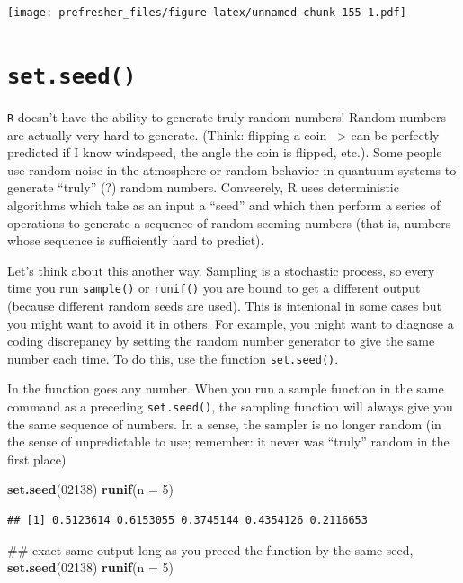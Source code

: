 \documentclass[]{book}
\newenvironment{Shaded}{\begin{snugshade}}{\end{snugshade}}
\newcommand{\KeywordTok}[1]{\textcolor[rgb]{0.13,0.29,0.53}{\textbf{#1}}}
\newcommand{\DataTypeTok}[1]{\textcolor[rgb]{0.13,0.29,0.53}{#1}}
\newcommand{\DecValTok}[1]{\textcolor[rgb]{0.00,0.00,0.81}{#1}}
\newcommand{\NormalTok}[1]{#1}
\theoremstyle{definition}
\theoremstyle{definition}
\theoremstyle{definition}
\theoremstyle{remark}
\begin{document}
\texttt{[image: prefresher\_files/figure-latex/unnamed-chunk-155-1.pdf]}

\section{\texorpdfstring{\texttt{set.seed()}}{set.seed()}}\label{set.seed}

\texttt{R} doesn't have the ability to generate truly random numbers!
Random numbers are actually very hard to generate. (Think: flipping a
coin --\textgreater{} can be perfectly predicted if I know windspeed,
the angle the coin is flipped, etc.). Some people use random noise in
the atmosphere or random behavior in quantuum systems to generate
``truly'' (?) random numbers. Convserely, R uses deterministic
algorithms which take as an input a ``seed'' and which then perform a
series of operations to generate a sequence of random-seeming numbers
(that is, numbers whose sequence is sufficiently hard to predict).

Let's think about this another way. Sampling is a stochastic process, so
every time you run \texttt{sample()} or \texttt{runif()} you are bound
to get a different output (because different random seeds are used).
This is intenional in some cases but you might want to avoid it in
others. For example, you might want to diagnose a coding discrepancy by
setting the random number generator to give the same number each time.
To do this, use the function \texttt{set.seed()}.

In the function goes any number. When you run a sample function in the
same command as a preceding \texttt{set.seed()}, the sampling function
will always give you the same sequence of numbers. In a sense, the
sampler is no longer random (in the sense of unpredictable to use;
remember: it never was ``truly'' random in the first place)

\begin{Shaded}
\begin{Highlighting}[]
\KeywordTok{set.seed}\NormalTok{(}\DecValTok{02138}\NormalTok{)}
\KeywordTok{runif}\NormalTok{(}\DataTypeTok{n =} \DecValTok{5}\NormalTok{)}
\end{Highlighting}
\end{Shaded}

\begin{verbatim}
## [1] 0.5123614 0.6153055 0.3745144 0.4354126 0.2116653
\end{verbatim}

\begin{Shaded}
\begin{Highlighting}[]
\NormalTok{## exact same output long as you preced the function by the same seed, }
\KeywordTok{set.seed}\NormalTok{(}\DecValTok{02138}\NormalTok{)}
\KeywordTok{runif}\NormalTok{(}\DataTypeTok{n =} \DecValTok{5}\NormalTok{)}
\end{Highlighting}
\end{Shaded}
\end{document}

